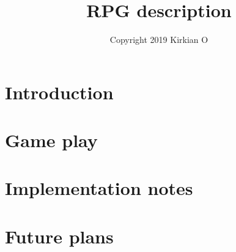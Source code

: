 \documentclass[12pt,fleqn]{article}
\title{RPG description}
\author{Copyright 2019 Kirkian O}
\begin{document}
\maketitle

\tableofcontents

\section{Introduction}\label{sec:intro}


\section{Game play}
\label{sec:play}


\section{Implementation notes}
\label{sec:impl}


\section{Future plans}
\label{sec:future}

\end{document}
